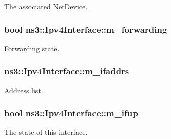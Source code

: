 The associated \hyperlink{classns3_1_1NetDevice}{Net\+Device}. 

\subsubsection[{\texorpdfstring{m\+\_\+forwarding}{m_forwarding}}]{\setlength{\rightskip}{0pt plus 5cm}bool ns3\+::\+Ipv4\+Interface\+::m\+\_\+forwarding\hspace{0.3cm}{\ttfamily [private]}}\hypertarget{classns3_1_1Ipv4Interface_a4cc4010f5d732b0602db968be2d4f0d3}{}\label{classns3_1_1Ipv4Interface_a4cc4010f5d732b0602db968be2d4f0d3}


Forwarding state. 

\subsubsection[{\texorpdfstring{m\+\_\+ifaddrs}{m_ifaddrs}}]{ ns3\+::\+Ipv4\+Interface\+::m\+\_\+ifaddrs\hspace{0.3cm}{\ttfamily [private]}}\hypertarget{classns3_1_1Ipv4Interface_a8a8497e4a1acab91a66b9054d63df9f9}{}\label{classns3_1_1Ipv4Interface_a8a8497e4a1acab91a66b9054d63df9f9}


\hyperlink{classns3_1_1Address}{Address} list. 

\subsubsection[{\texorpdfstring{m\+\_\+ifup}{m_ifup}}]{\setlength{\rightskip}{0pt plus 5cm}bool ns3\+::\+Ipv4\+Interface\+::m\+\_\+ifup\hspace{0.3cm}{\ttfamily [private]}}\hypertarget{classns3_1_1Ipv4Interface_ae57ec1ab551108d7f78aa10135e14c90}{}\label{classns3_1_1Ipv4Interface_ae57ec1ab551108d7f78aa10135e14c90}


The state of this interface. 

